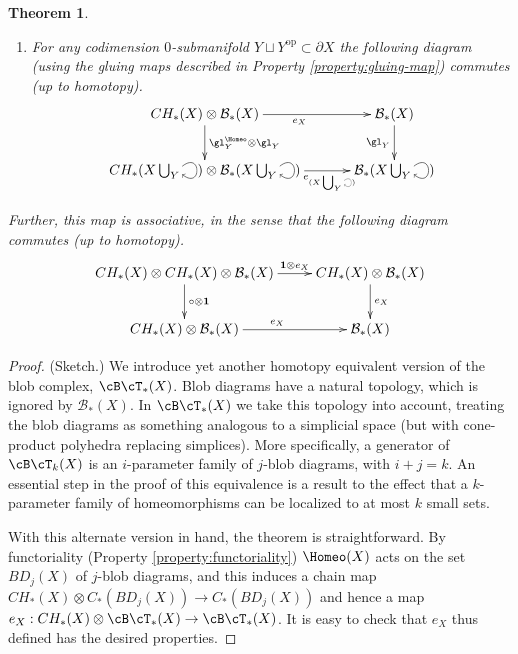 \documentclass{pnastwo}
\def\bc{{\mathcal B}}
\newcommand{\CH}[1]{CH_*(#1)}
\newcommand{\tensor}{\otimes}
\newcommand{\selfarrow}{\ensuremath{\smash{\tikz[baseline]{\clip (0,0.36) rectangle (0.39,-0.16); \draw[->] (0,0.2) .. controls (0.5,0.6) and (0.5,-0.4) .. (0,0);}}}}
\newcommand{\bdy}{\partial}
\newcommand{\compose}{\circ}
\newcommand{\id}{\boldsymbol{1}}
\newtheorem{thm}[prop]{Theorem}
\begin{document}
\begin{article}
\begin{thm}
\begin{enumerate}
\item For
any codimension $0$-submanifold $Y \sqcup Y^\text{op} \subset \bdy X$ the following diagram
(using the gluing maps described in Property \ref{property:gluing-map}) commutes (up to homotopy).
\begin{equation*}
\xymatrix@C+0.3cm{
     \CH{X} \tensor \bc_*(X)
        \ar[r]_{e_{X}}  \ar[d]^{\gl^{\Homeo}_Y \tensor \gl_Y}  &
            \bc_*(X) \ar[d]_{\gl_Y} \\
     \CH{X \bigcup_Y \selfarrow} \tensor \bc_*(X \bigcup_Y \selfarrow) \ar[r]_<<<<<<<{e_{(X \bigcup_Y \scalebox{0.5}{\selfarrow})}}    & \bc_*(X \bigcup_Y \selfarrow)
}
\end{equation*}
\end{enumerate}

Further, this map is associative, in the sense that the following diagram commutes (up to homotopy).
\begin{equation*}
\xymatrix{
\CH{X} \tensor \CH{X} \tensor \bc_*(X) \ar[r]^<<<<<{\id \tensor e_X} \ar[d]^{\compose \tensor \id} & \CH{X} \tensor \bc_*(X) \ar[d]^{e_X} \\
\CH{X} \tensor \bc_*(X) \ar[r]^{e_X} & \bc_*(X)
}
\end{equation*}
\end{thm}

\begin{proof}(Sketch.)
We introduce yet another homotopy equivalent version of
the blob complex, $\cB\cT_*(X)$.
Blob diagrams have a natural topology, which is ignored by $\bc_*(X)$.
In $\cB\cT_*(X)$ we take this topology into account, treating the blob diagrams as something
analogous to a simplicial space (but with cone-product polyhedra replacing simplices).
More specifically, a generator of $\cB\cT_k(X)$ is an $i$-parameter family of $j$-blob diagrams, with $i+j=k$. 
An essential step in the proof of this equivalence is a result to the effect that a $k$-parameter 
family of homeomorphisms can be localized to at most $k$ small sets.

With this alternate version in hand, the theorem is straightforward.
By functoriality (Property \ref{property:functoriality}) $\Homeo(X)$ acts on the set $BD_j(X)$ of $j$-blob diagrams, and this
induces a chain map $\CH{X}\tensor C_*(BD_j(X))\to C_*(BD_j(X))$
and hence a map $e_X: \CH{X} \tensor \cB\cT_*(X) \to \cB\cT_*(X)$.
It is easy to check that $e_X$ thus defined has the desired properties.
\end{proof}


\end{article}
\end{document}
